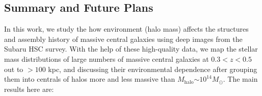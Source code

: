 \documentclass{emulateapj}
\def\redm{\texttt{redMaPPer}}
\def\nbcg{\texttt{cenLowMh}}
\def\mstar{{$M_{\star}$}}
\def\mhalo{{$M_{\mathrm{halo}}$}}
\newcommand{\addref}{{\textcolor{red}{REF}}}
\newcommand{\update}[1]{\textcolor{Bittersweet}{#1}}
\begin{document}
\begin{CJK*}{UTF8}{gbsn}
%
%    
%    


\section{Summary and Future Plans}
    \label{sec:summary}

    \update{ 
    In this work, we study the how environment (halo mass) affects the structures and
    assembly history of massive central galaxies using deep images from the Subaru HSC 
    survey.
    With the help of these high-quality data, we map the stellar mass distributions of 
    large numbers of massive central galaxies at $0.3 < z < 0.5$ out to $>100$ kpc, 
    and discussing their environmental dependence after grouping them into centrals of 
    halos more and less massive than \mhalo{}$\sim 10^{14} M_{\odot}$. 
    The main results here are:}
    

\end{CJK*}
\end{document}
